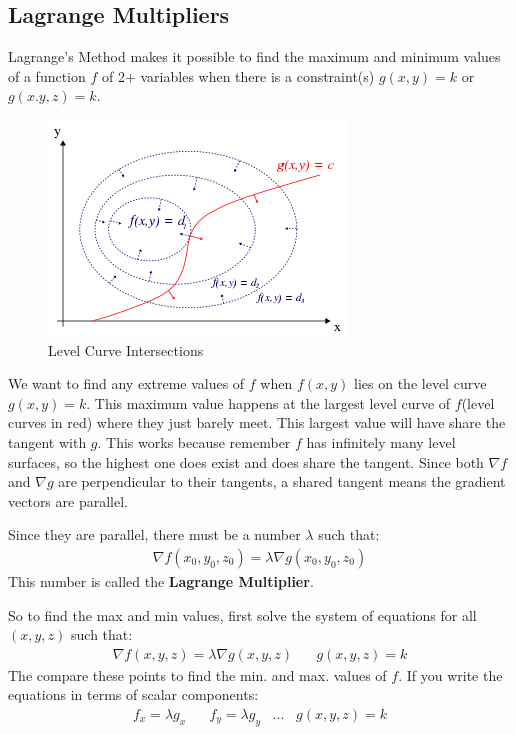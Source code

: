 \documentclass{article}
\newcommand{\n}{\nabla}
\begin{document}
\subsection{Lagrange Multipliers}
Lagrange's Method makes it possible to find the maximum and minimum values of a function $f$ of 2+ variables when there is a constraint(s) $g(x,y) = k$ or $g(x.y,z) = k$.
\begin{figure}[H]
\begin{center}
\includegraphics[scale=0.7]{LagrangeMultiplier.png}
\caption{Level Curve Intersections}
\label{lag-mult}
\end{center}
\end{figure}
We want to find any extreme values of $f$ when $f(x,y)$ lies on the level curve $g(x,y) = k$. This maximum value happens at the largest level curve of $f$(level curves in red) where they just barely meet. This largest value will have share the tangent with $g$. This works because remember $f$ has infinitely many level surfaces, so the highest one does exist and does share the tangent. Since both $\n f$ and $\n g$ are perpendicular to their tangents, a shared tangent means the gradient vectors are parallel.

Since they are parallel, there must be a number $\lambda$ such that:
\begin{gather*}
    \n f(x_0,y_0,z_0) = \lambda \n g(x_0,y_0,z_0)
\end{gather*}
This number is called the \textbf{Lagrange Multiplier}.

So to find the max and min values, first solve the system of equations for all $(x,y,z)$ such that:
\begin{gather*}
    \n f(x,y,z) = \lambda \n g(x,y,z)\hspace{20pt}g(x,y,z) = k
\end{gather*}
The compare these points to find the min. and max. values of $f$. If you write the equations in terms of scalar components:
\begin{gather*}
    f_x = \lambda g_x\hspace{20pt}f_y = \lambda g_y\hspace{10pt}...\hspace{10pt}g(x,y,z) = k
\end{gather*}
\end{document}
